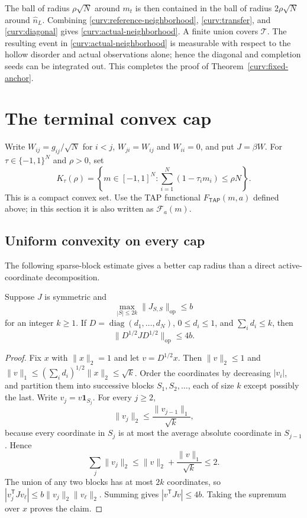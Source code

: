 \documentclass[11pt,reqno]{amsart}
\def\tap{{\mathsf{TAP}}}
\newcommand{\op}{\operatorname{op}}
\begin{document}
The ball of radius $\rho\sqrt N$ around $m_t$ is then contained in the
ball of radius $2\rho\sqrt N$ around $\widehat n_L$. Combining
\eqref{curv:reference-neighborhood}, \eqref{curv:transfer}, and
\eqref{curv:diagonal} gives \eqref{curv:actual-neighborhood}. A finite
union covers $\mathcal T$. The resulting event in
\eqref{curv:actual-neighborhood} is measurable with respect to the hollow
disorder and actual observations alone; hence the diagonal and completion
seeds can be integrated out. This completes the proof of
Theorem~\ref{curv:fixed-anchor}.


\section{The terminal convex cap}
\label{sec:terminal-proof}

Write $W_{ij}=g_{ij}/\sqrt N$ for $i<j$, $W_{ji}=W_{ij}$ and $W_{ii}=0$,
and put $J=\beta W$. For $\tau\in\{-1,1\}^N$ and $\rho>0$, set
\[
 K_\tau(\rho)=\left\{m\in[-1,1]^N:
       \sum_{i=1}^N(1-\tau_i m_i)\le\rho N\right\}.
\]
This is a compact convex set. Use the TAP functional $ F_{\tap}(m,a)$ defined above; in this section it is also written as $\mathcal F_a(m)$.

\subsection{Uniform convexity on every cap}

The following sparse-block estimate gives a better cap radius than a
direct active-coordinate decomposition.

\begin{lem}
Suppose $J$ is symmetric and
\[
 \max_{|S|\le2k}\|J_{S,S}\|_{\op}\le b
\]
for an integer $k\ge1$. If $D=\operatorname{diag}(d_1,\ldots,d_N)$,
$0\le d_i\le1$, and $\sum_i d_i\le k$, then
\[
 \|D^{1/2}JD^{1/2}\|_{\op}\le4b.
\]
\end{lem}

\begin{proof}
Fix $x$ with $\|x\|_2=1$ and let $v=D^{1/2}x$. Then
$\|v\|_2\le1$ and
$\|v\|_1\le(\sum_i d_i)^{1/2}\|x\|_2\le\sqrt k$.
Order the coordinates by decreasing $|v_i|$, and partition them into
successive blocks $S_1,S_2,\ldots$, each of size $k$ except possibly the
last. Write $v_j=v\mathbf1_{S_j}$. For every $j\ge2$,
\[
 \|v_j\|_2\le\frac{\|v_{j-1}\|_1}{\sqrt k},
\]
because every coordinate in $S_j$ is at most the average absolute
coordinate in $S_{j-1}$. Hence
\[
 \sum_j\|v_j\|_2\le\|v\|_2+\frac{\|v\|_1}{\sqrt k}\le2.
\]
The union of any two blocks has at most $2k$ coordinates, so
$|v_j^{\mathsf T}Jv_\ell|\le b\|v_j\|_2\|v_\ell\|_2$.
Summing gives $|v^{\mathsf T}Jv|\le4b$. Taking the supremum over $x$
proves the claim.
\end{proof}
\end{document}
